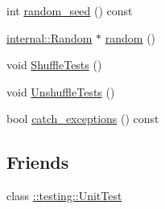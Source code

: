 \begin{DoxyCompactItemize}
\item 
int \hyperlink{classtesting_1_1internal_1_1_unit_test_impl_a8ec59a7ab3bad96bccde98ce85ffc864}{random\-\_\-seed} () const 
\item 
\hyperlink{classtesting_1_1internal_1_1_random}{internal\-::\-Random} $\ast$ \hyperlink{classtesting_1_1internal_1_1_unit_test_impl_ab3b45b5eb4d583219a3602011ea44347}{random} ()
\item 
void \hyperlink{classtesting_1_1internal_1_1_unit_test_impl_aaaa38e6a4372e6bb9bbe3143a3a32b65}{Shuffle\-Tests} ()
\item 
void \hyperlink{classtesting_1_1internal_1_1_unit_test_impl_a1ee7db3bf8284dd9dce4dc857564bce3}{Unshuffle\-Tests} ()
\item 
bool \hyperlink{classtesting_1_1internal_1_1_unit_test_impl_a0bbc6e237776ee6afaee106fe83e0406}{catch\-\_\-exceptions} () const 
\end{DoxyCompactItemize}
\subsection*{Friends}
\begin{DoxyCompactItemize}
\item 
class \hyperlink{classtesting_1_1internal_1_1_unit_test_impl_a893404438388dec058dc5c02e8f9a014}{\-::testing\-::\-Unit\-Test}
\end{DoxyCompactItemize}


